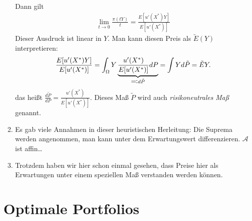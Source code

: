 \documentclass[a4paper,twoside,DIV15,BCOR12mm]{scrbook}
\newcommand{\cA}{\mathcal A}
\begin{document}
\begin{bemerkung}
\begin{enumerate}
Dann gilt
\begin{align*}
\lim_{t\to0} \frac{\pi(tY)}{t} = \frac{E[u'(X^*)Y]}{E[u'(X^*)]}
\end{align*}
Dieser Ausdruck ist linear in $Y$. Man kann diesen Preis als $\tilde E(Y)$ interpretieren:
\begin{align*}
\frac{E[u'(X^*)Y]}{E[u'(X^*)]} = \int_{\Omega} Y \underbrace{\frac{u'(X^*)}{E[u'(X^*)]} dP}_{\ad d\tilde P} = \int Y d\tilde P = \tilde EY.
\end{align*}
das heißt $\frac{d\tilde P}{dP} = \frac{u'(X^*)}{E[u'(X^*)]}$. Dieses Maß $\tilde P$ wird auch \emph{risikoneutrales Maß} genannt.

\item Es gab viele Annahmen in dieser heuristischen Herleitung: Die Suprema werden angenommen, man kann unter dem Erwartungswert differenzieren. $\cA$ ist affin\dots

\item Trotzdem haben wir hier schon einmal gesehen, dass Preise hier als Erwartungen unter einem speziellen Maß verstanden werden können.
\end{enumerate}
\end{bemerkung}


\section{Optimale Portfolios}
\end{document}
